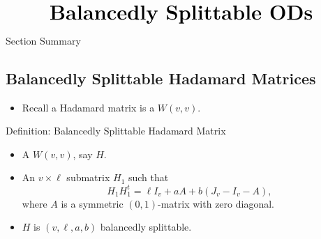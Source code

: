 \documentclass{beamer}
\begin{document}
\begin{frame}
  \[
    \text{\huge\bf Balancedly Splittable ODs}
  \]
\end{frame}

\begin{frame}{Section Summary}
  \tableofcontents[sections={2}]
\end{frame}


\subsection{Balancedly Splittable Hadamard Matrices}

\begin{frame}

  \begin{itemize}
  \item Recall a Hadamard matrix is a $W(v,v)$.
  \end{itemize}

  \begin{block}{Definition: Balancedly Splittable Hadamard Matrix \cite[][]{splittable-hadamard}}
    \begin{itemize}
    \item A $W(v,v)$, say $H$.
    \item An $v \times \ell$ submatrix $H_1$ such that
      \[
        H_1H_1^t = \ell I_v + aA + b(J_v-I_v-A),
      \]
      where $A$ is a symmetric $(0,1)$-matrix with zero diagonal.
    \item $H$ is $(v,\ell,a,b)$ balancedly splittable.
    \end{itemize}
  \end{block}
  
\end{frame}
\end{document}
